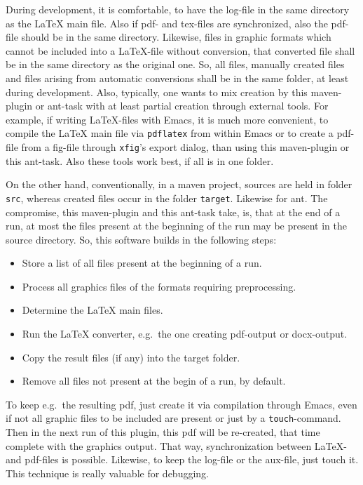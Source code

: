 During development, it is comfortable, 
to have the log-file in the same directory as the \LaTeX{} main file. 
Also if pdf- and tex-files are synchronized, 
also the pdf-file should be in the same directory. 
Likewise, files in graphic formats 
which cannot be included into a \LaTeX-file without conversion, 
that converted file shall be in the same directory as the original one. 
So, all files, manually created files 
and files arising from automatic conversions 
shall be in the same folder, at least during development. 
Also, typically, one wants to mix creation by this maven-plugin or ant-task 
with at least partial creation through external tools. 
For example, if writing \LaTeX-files with Emacs, 
it is much more convenient, to compile the \LaTeX{} main file 
via \texttt{pdflatex} from within Emacs 
or to create a pdf-file from a \gls{fig}-file 
through \texttt{xfig}'s export dialog, 
than using this maven-plugin or this ant-task. 
Also these tools work best, if all is in one folder. 

On the other hand, 
conventionally, in a maven project, 
sources are held in folder \texttt{src}, 
whereas created files occur in the folder \texttt{target}. 
Likewise for ant. 
The compromise, this maven-plugin and this ant-task take, 
is, that at the end of a run, 
at most the files present at the beginning of the run 
may be present in the source directory. 
So, this software builds in the following steps: 
%
\begin{itemize}
\item
Store a list of all files present at the beginning of a run.
\item
Process all graphics files of the formats requiring preprocessing.
\item
Determine the \LaTeX{} main files.
\item
Run the \LaTeX{} converter, e.g.~the one creating pdf-output or docx-output.
\item
Copy the result files (if any) into the target folder.
\item
Remove all files not present at the begin of a run, by default. 
\end{itemize}

To keep e.g.~the resulting pdf, 
just create it via compilation through Emacs, 
even if not all graphic files to be included are present 
or just by a \texttt{touch}-command. 
Then in the next run of this plugin, 
this pdf will be re-created, 
that time complete with the graphics output. 
That way, synchronization between \LaTeX- and pdf-files is possible. 
Likewise, to keep the log-file or the aux-file, just touch it. 
This technique is really valuable for debugging. 

